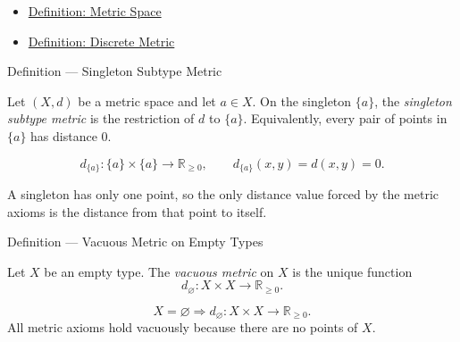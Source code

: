 \begin{dependencies}
\begin{itemize}
  \item \hyperref[def:metric-space]{Definition: Metric Space}
  \item \hyperref[def:discrete-metric]{Definition: Discrete Metric}
\end{itemize}
\end{dependencies}

\begin{definitionbox}{Definition --- Singleton Subtype Metric}
\begin{definition}\label{def:singleton-subtype-metric}
Let \((X,d)\) be a metric space and let \(a\in X\).  On the singleton
\(\{a\}\), the \emph{singleton subtype metric} is the restriction of \(d\) to
\(\{a\}\).  Equivalently, every pair of points in \(\{a\}\) has distance
\(0\).
\end{definition}
\end{definitionbox}

\begin{remark*}
\[
d_{\{a\}}:\{a\}\times\{a\}\to\mathbb{R}_{\geq 0},
\qquad
d_{\{a\}}(x,y)=d(x,y)=0.
\]
\end{remark*}

\begin{remark*}[Interpretation]
A singleton has only one point, so the only distance value forced by the
metric axioms is the distance from that point to itself.
\end{remark*}


\DefinitionalRoot

\begin{definitionbox}{Definition --- Vacuous Metric on Empty Types}
\begin{definition}
\label{def:vacuous-metric-empty-types}
Let \(X\) be an empty type.  The \emph{vacuous metric} on \(X\) is the unique
function
\[
  d_{\varnothing}:X\times X\to\mathbb{R}_{\geq 0}.
\]
\end{definition}
\end{definitionbox}

\begin{remark*}
\[
X=\varnothing
\Longrightarrow
d_{\varnothing}:X\times X\to\mathbb{R}_{\geq 0}.
\]
All metric axioms hold vacuously because there are no points of \(X\).
\end{remark*}

